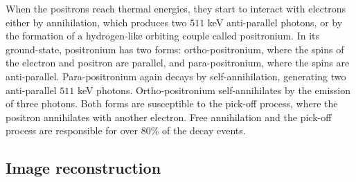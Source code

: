When the positrons reach thermal energies, they start to interact with electrons either by annihilation, which produces two $511$ keV anti-parallel photons, or by the formation of a hydrogen-like orbiting couple called positronium. In its ground-state, positronium has two forms: ortho-positronium, where the spins of the electron and positron are parallel, and para-positronium, where the spins are anti-parallel. Para-positronium again decays by self-annihilation, generating two anti-parallel $511$ keV photons. Ortho-positronium self-annihilates by the emission of three photons. Both forms are susceptible to the pick-off process, where the positron annihilates with another electron. Free annihilation and the pick-off process are responsible for over $80\%$ of the decay events.

\subsection{Image reconstruction}

